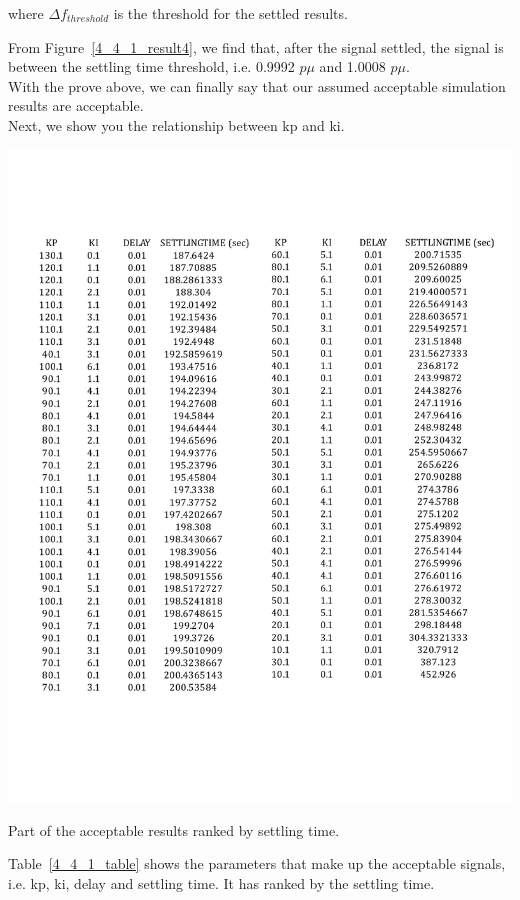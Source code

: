 where $\Delta f_{threshold}$ is the threshold for the settled results.

From Figure~\ref{4_4_1_result4}, we find that, after the signal settled, the signal is between the settling time threshold, i.e. 0.9992 $p\mu$ and 1.0008 $p\mu$.\\


With the prove above, we can finally say that our assumed acceptable simulation results are acceptable.\\

Next, we show you the relationship between kp and ki. 

\begin{table}[htbp]
\centering
\includegraphics[width = \textwidth]{figure/4_4_1_table.pdf}
\caption{Part of the acceptable results ranked by settling time.}
\label{4_4_1_table}
\end{table}

Table~\ref{4_4_1_table} shows the parameters that make up the acceptable signals, i.e. kp, ki, delay and settling time. It has ranked by the settling time.  

